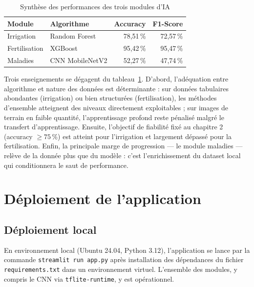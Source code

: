 \begin{table}[H]
	\centering
	\caption{Synthèse des performances des trois modules d'IA}
	\label{tab:synthese}
	\begin{tabularx}{\textwidth}{lXrr}
		\toprule
		\textbf{Module} & \textbf{Algorithme} & \textbf{Accuracy} &
		\textbf{F1-Score} \\
		\midrule
		Irrigation    & Random Forest    & 78,51\,\% & 72,57\,\% \\
		Fertilisation & XGBoost          & 95,42\,\% & 95,47\,\% \\
		Maladies      & CNN MobileNetV2  & 52,27\,\% & 47,74\,\% \\
		\bottomrule
	\end{tabularx}
\end{table}

Trois enseignements se dégagent du tableau~\ref{tab:synthese}.
D'abord, l'adéquation entre algorithme et nature des données est
déterminante : sur données tabulaires abondantes (irrigation) ou
bien structurées (fertilisation), les méthodes d'ensemble
atteignent des niveaux directement exploitables ; sur images de
terrain en faible quantité, l'apprentissage profond reste
pénalisé malgré le transfert d'apprentissage. Ensuite, l'objectif
de fiabilité fixé au chapitre 2 (accuracy $\geq 75\,\%$) est
atteint pour l'irrigation et largement dépassé pour la
fertilisation. Enfin, la principale marge de progression ---
le module maladies --- relève de la donnée plus que du modèle :
c'est l'enrichissement du dataset local qui conditionnera le
saut de performance.

\section{Déploiement de l'application}
\label{sec:deploiement}

\subsection{Déploiement local}

En environnement local (Ubuntu 24.04, Python 3.12),
l'application se lance par la commande
\texttt{streamlit run app.py} après installation des dépendances
du fichier \texttt{requirements.txt} dans un environnement
virtuel. L'ensemble des modules, y compris le CNN via
\texttt{tflite-runtime}, y est opérationnel.


